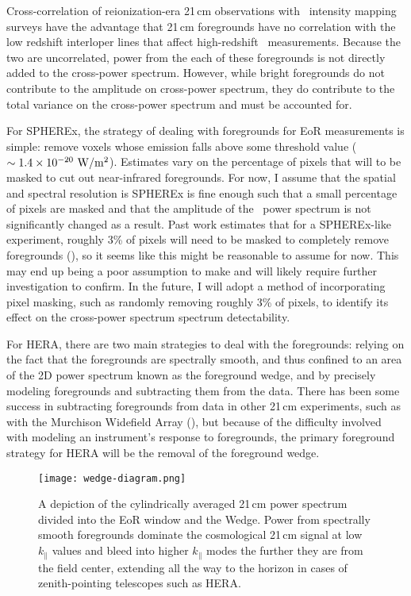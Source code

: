 \label{sec:foregrounds}

Cross-correlation of reionization-era 21\,cm observations with \lya\ intensity
mapping surveys have the advantage that 21\,cm foregrounds have no correlation with
the low redshift interloper lines that affect high-redshift \lya\ measurements.
Because the two are uncorrelated, power from the each of these foregrounds is not directly
added to the cross-power spectrum. However, while bright foregrounds do not contribute
to the amplitude on cross-power spectrum, they do contribute to the total variance
on the cross-power spectrum and must be accounted for.

For SPHEREx, the strategy of dealing with foregrounds for EoR measurements is simple:
remove voxels whose emission falls above some threshold value ($\sim 1.4 \times 10^{-20} \ \rm W / m^2$).
Estimates vary on the percentage of pixels that will to be masked to cut out near-infrared foregrounds.
For now, I assume that the spatial and spectral resolution is SPHEREx is fine enough
such that a small percentage of pixels are masked and that the amplitude of the
\lya\ power spectrum is not significantly changed as a result. Past
work estimates that for a SPHEREx-like experiment, roughly 3\% of pixels will need
to be masked to completely remove foregrounds (\cite{2014ApJ...785...72G}), so it seems like this might be reasonable
to assume for now. This may end up being a poor assumption to make and will likely require
further investigation to confirm. In the future, I will adopt a method of incorporating
pixel masking, such as randomly removing roughly 3\% of pixels, to identify its effect on the
cross-power spectrum spectrum detectability.

For HERA, there are two main strategies to deal with the foregrounds:
relying on the fact that the foregrounds are spectrally smooth, and thus confined
to an area of the 2D power spectrum known as the foreground wedge, and by precisely modeling
foregrounds and subtracting them from the data. There has been some success in subtracting
foregrounds from data in other 21\,cm experiments, such as with the Murchison Widefield Array (\cite{2019ApJ...884....1B}),
but because of the difficulty involved with modeling an instrument's response to foregrounds,
the primary foreground strategy for HERA will be the removal of the foreground wedge.

\begin{figure}[ht]
	\centering
	\texttt{[image: wedge-diagram.png]}
	\caption[Foreground Wedge]{A depiction of the cylindrically averaged 21\,cm power spectrum divided into
					the EoR window and the Wedge. Power from spectrally smooth foregrounds dominate the cosmological
					21\,cm signal at low $k_{\parallel}$ values and bleed into higher $k_{\parallel}$ modes the further
					they are from the field center, extending all the way to the horizon in cases of zenith-pointing
					telescopes such as HERA.}
	\label{fig:wedge}
\end{figure}

